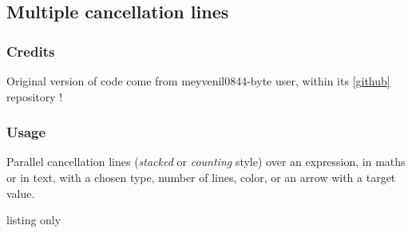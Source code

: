 \documentclass[11pt,a4paper]{ltxdoc}
\begin{document}
\begin{DemoCode}{}
\end{DemoCode}

\begin{DemoCode}{}
\end{DemoCode}

\pagebreak

\subsection{Multiple cancellation lines}

\subsubsection{Credits}

Original version of code come from \textsf{meyvenil0844-byte} user, within its \href{https://github.com/meyvenil0844-byte/-multicancel}{[github]} repository !

\subsubsection{Usage}

Parallel cancellation lines (\textit{stacked} or \textit{counting} style) over an expression,
in maths or in text, with a chosen type, number of lines, color, or an arrow with a target value.

\begin{DemoCode}{listing only}


\end{DemoCode}
\end{document}
